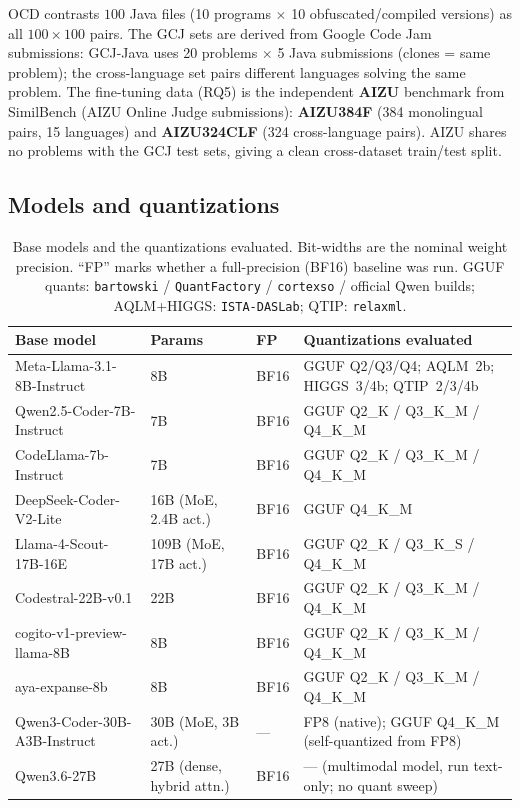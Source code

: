 \documentclass[11pt]{article}
\begin{document}
\noindent OCD contrasts $100$ Java files (10 programs $\times$ 10
obfuscated/compiled versions) as all $100\times100$ pairs. The GCJ sets are
derived from Google Code Jam submissions: GCJ-Java uses 20 problems $\times$ 5
Java submissions (clones = same problem); the cross-language set pairs different
languages solving the same problem. The fine-tuning data (RQ5) is the
independent \textbf{AIZU} benchmark from SimilBench (AIZU Online Judge
submissions): \textbf{AIZU384F} (384 monolingual pairs, 15 languages) and
\textbf{AIZU324CLF} (324 cross-language pairs). AIZU shares no problems with the
GCJ test sets, giving a clean cross-dataset train/test split.

\subsection{Models and quantizations}
\begin{table}[htbp]
  \centering
  \caption{Base models and the quantizations evaluated. Bit-widths are the
           nominal weight precision. ``FP'' marks whether a full-precision
           (BF16) baseline was run. GGUF quants: \texttt{bartowski} /
           \texttt{QuantFactory} / \texttt{cortexso} / official Qwen builds;
           AQLM+HIGGS: \texttt{ISTA-DASLab}; QTIP: \texttt{relaxml}.}
  \label{tab:models}
  \small
  \begin{tabular}{llll}
    \toprule
    \textbf{Base model} & \textbf{Params} & \textbf{FP} & \textbf{Quantizations evaluated} \\
    \midrule
    Meta-Llama-3.1-8B-Instruct     & 8B            & BF16 & GGUF Q2/Q3/Q4; AQLM~2b; HIGGS~3/4b; QTIP~2/3/4b \\
    Qwen2.5-Coder-7B-Instruct      & 7B            & BF16 & GGUF Q2\_K / Q3\_K\_M / Q4\_K\_M \\
    CodeLlama-7b-Instruct          & 7B            & BF16 & GGUF Q2\_K / Q3\_K\_M / Q4\_K\_M \\
    DeepSeek-Coder-V2-Lite         & 16B (MoE, 2.4B act.) & BF16 & GGUF Q4\_K\_M \\
    Llama-4-Scout-17B-16E          & 109B (MoE, 17B act.) & BF16 & GGUF Q2\_K / Q3\_K\_S / Q4\_K\_M \\
    Codestral-22B-v0.1             & 22B           & BF16 & GGUF Q2\_K / Q3\_K\_M / Q4\_K\_M \\
    cogito-v1-preview-llama-8B     & 8B            & BF16 & GGUF Q2\_K / Q3\_K\_M / Q4\_K\_M \\
    aya-expanse-8b                 & 8B            & BF16 & GGUF Q2\_K / Q3\_K\_M / Q4\_K\_M \\
    Qwen3-Coder-30B-A3B-Instruct   & 30B (MoE, 3B act.) & --- & FP8 (native); GGUF Q4\_K\_M (self-quantized from FP8) \\
    Qwen3.6-27B                    & 27B (dense, hybrid attn.) & BF16 & --- (multimodal model, run text-only; no quant sweep) \\
    \bottomrule
  \end{tabular}
\end{table}
\end{document}
